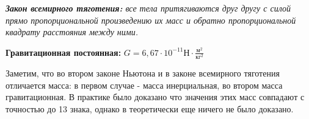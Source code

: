 \documentclass[../main.tex]{subfiles}
\begin{document}
\vspace{5px}

\textit{\textbf{Закон всемирного тяготения: }все тела притягиваются друг другу с силой прямо пропорциональной произведению их масс и обратно пропорциональной квадрату расстояния между ними.}

\vspace{5px}

\textbf{Гравитационная постоянная: }$G = 6,67 \cdot 10^{-11} \text{Н} \cdot \frac{\text{м}^2}{\text{кг}^2}$

\vspace{5px}

Заметим, что во втором законе Ньютона и в законе всемирного тяготения отличается масса: в первом случае - масса инерциальная, во втором масса гравитационная. В практике было доказано что значения этих масс совпадают с точностью до 13 знака, однако в теоретически еще ничего не было доказано.
\end{document}
